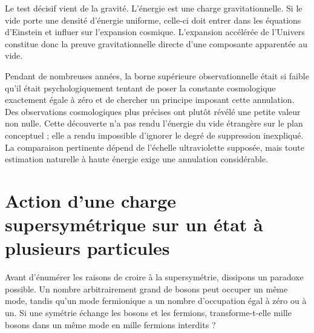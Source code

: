 Le test décisif vient de la gravité. L’énergie est une charge gravitationnelle. Si le vide porte une densité d’énergie uniforme, celle-ci doit entrer dans les équations d’Einstein et influer sur l’expansion cosmique. L’expansion accélérée de l’Univers constitue donc la preuve gravitationnelle directe d’une composante apparentée au vide.

\begin{classroomqa}
\end{classroomqa}

Pendant de nombreuses années, la borne supérieure observationnelle était si faible qu’il était psychologiquement tentant de poser la constante cosmologique exactement égale à zéro et de chercher un principe imposant cette annulation. Des observations cosmologiques plus précises ont plutôt révélé une petite valeur non nulle. Cette découverte n’a pas rendu l’énergie du vide étrangère sur le plan conceptuel ; elle a rendu impossible d’ignorer le degré de suppression inexpliqué. La comparaison pertinente dépend de l’échelle ultraviolette supposée, mais toute estimation naturelle à haute énergie exige une annulation considérable.

\section{Action d’une charge supersymétrique sur un état à plusieurs particules}

Avant d’énumérer les raisons de croire à la supersymétrie, dissipons un paradoxe possible. Un nombre arbitrairement grand de bosons peut occuper un même mode, tandis qu’un mode fermionique a un nombre d’occupation égal à zéro ou à un. Si une symétrie échange les bosons et les fermions, transforme-t-elle mille bosons dans un même mode en mille fermions interdits ?

